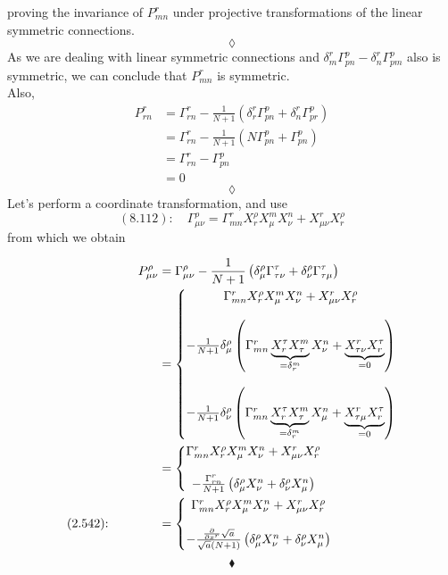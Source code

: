 proving the invariance of $P^{r}_{mn}$ under projective transformations of the linear symmetric connections.
$$\lozenge$$
As we are dealing with linear symmetric connections and $\delta^r_m \Gamma^{p}_{pn}-  \delta^r_n \Gamma^{p}_{pm} $ also is symmetric, we can conclude that $P^{r}_{mn}$ is symmetric. \\
Also,
\begin{align*}
P^{r}_{rn} &= \Gamma ^{r}_{rn}-\frac{1}{N+1}\left(\delta^r_r \Gamma^p_{pn}+  \delta^r_n \Gamma^p_{pr} \right)\\
&= \Gamma ^{r}_{rn}-\frac{1}{N+1}\left(N \Gamma^p_{pn}+  \Gamma^p_{pn} \right)\\
&= \Gamma ^{r}_{rn}-\Gamma^p_{pn}\\
&=0
\end{align*}
$$\lozenge$$
Let's perform a coordinate transformation, and use $$\mathbf{(8.112)}: \quad \Gamma^{\rho}_{\mu\nu} = \Gamma^{r}_{mn}X^{\rho}_{r}X^{m}_{\mu}X^{n}_{\nu}+ X^{r}_{\mu\nu}X^{\rho}_{r}$$ from which we obtain

\begin{align*}
P^{\rho}_{\mu\nu} &= \Gamma^{\rho}_{\mu\nu}-\frac{1}{N+1}\left(\delta^{\rho}_{\mu} \Gamma^{\tau}_{\tau \nu}+  \delta^{\rho}_{\nu} \Gamma^{\tau}_{\tau \mu} \right)\\
&= \left\{\begin{matrix}\Gamma^{r}_{mn}X^{\rho}_{r}X^{m}_{\mu}X^{n}_{\nu}+ X^{r}_{\mu\nu}X^{\rho}_{r}\\\\
-\frac{1}{N+1}\delta^{\rho}_{\mu} \left(\Gamma^{r}_{mn}\underbrace{X^{\tau}_{r}X^{m}_{\tau}}_{=\delta^m_r}X^{n}_{\nu}+ \underbrace{X^{r}_{\tau\nu}X^{\tau}_{r}}_{=0}\right)\\\\
-\frac{1}{N+1} \delta^{\rho}_{\nu} \left(\Gamma^{r}_{mn}\underbrace{X^{\tau}_{r}X^{m}_{\tau}}_{=\delta^m_r}X^{n}_{\mu}+\underbrace{ X^{r}_{\tau\mu}X^{\tau}_{r}}_{=0}\right)
\end{matrix}\right.\\
&= \left\{\begin{matrix}\Gamma^{r}_{mn}X^{\rho}_{r}X^{m}_{\mu}X^{n}_{\nu}+ X^{r}_{\mu\nu}X^{\rho}_{r}\\\\
-\frac{\Gamma^{r}_{rn}}{N+1}\left(\delta^{\rho}_{\mu} X^{n}_{\nu}
+\delta^{\rho}_{\nu}X^{n}_{\mu}\right)
\end{matrix}\right.\\
\text{(2.542):}\quad\quad\quad\quad&= \left\{\begin{matrix}\Gamma^{r}_{mn}X^{\rho}_{r}X^{m}_{\mu}X^{n}_{\nu}+ X^{r}_{\mu\nu}X^{\rho}_{r}\\\\
-\frac{\pdv{}{x^r}\sqrt{a}}{\sqrt{a}(N+1)}\left(\delta^{\rho}_{\mu} X^{n}_{\nu}
+\delta^{\rho}_{\nu}X^{n}_{\mu}\right)
\end{matrix}\right.
\end{align*}
$$\blacklozenge$$
\newpage



